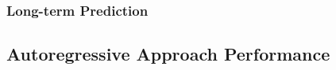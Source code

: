 \documentclass[12pt,a4paper]{article}
\begin{document}


\subsubsection{Long-term Prediction}

\subsection{Autoregressive Approach Performance}

\end{document}
